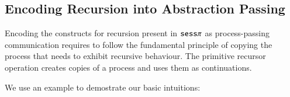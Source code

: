 

\subsection{Encoding Recursion into Abstraction Passing}

Encoding the constructs for recursion present in $\mathtt{sess}\pi$ as process-passing
communication requires to follow the fundamental
principle of copying the process that needs to exhibit recursive behaviour.
The primitive recursor operation creates copies of a process and uses them
as continuations.

We use an example to demostrate our basic intuitions:
